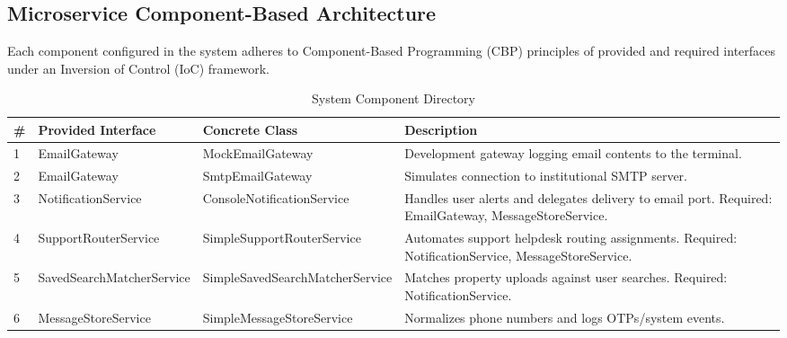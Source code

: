 \documentclass[12pt,a4paper]{article}
\begin{document}
\subsection{Microservice Component-Based Architecture}
Each component configured in the system adheres to Component-Based Programming (CBP) principles of provided and required interfaces under an Inversion of Control (IoC) framework.

\begin{table}[H]
\centering
\small
\renewcommand{\arraystretch}{1.3}
\begin{tabular}{p{} p{} p{} p{}}
\toprule
\textbf{\#} & \textbf{Provided Interface} & \textbf{Concrete Class} & \textbf{Description} \\
\midrule
1 & \hspace{0pt}Email\-Gateway & \hspace{0pt}Mock\-Email\-Gateway & Development gateway logging email contents to the terminal. \\
2 & \hspace{0pt}Email\-Gateway & \hspace{0pt}Smtp\-Email\-Gateway & Simulates connection to institutional SMTP server. \\
3 & \hspace{0pt}Notification\-Service & \hspace{0pt}Console\-Notification\-Service & Handles user alerts and delegates delivery to email port. Required: \hspace{0pt}Email\-Gateway, \hspace{0pt}Message\-Store\-Service. \\
4 & \hspace{0pt}Support\-Router\-Service & \hspace{0pt}Simple\-Support\-Router\-Service & Automates support helpdesk routing assignments. Required: \hspace{0pt}Notification\-Service, \hspace{0pt}Message\-Store\-Service. \\
5 & \hspace{0pt}Saved\-Search\-Matcher\-Service & \hspace{0pt}Simple\-Saved\-Search\-Matcher\-Service & Matches property uploads against user searches. Required: \hspace{0pt}Notification\-Service. \\
6 & \hspace{0pt}Message\-Store\-Service & \hspace{0pt}Simple\-Message\-Store\-Service & Normalizes phone numbers and logs OTPs/system events. \\
\bottomrule
\end{tabular}
\caption{System Component Directory}
\label{tab:components}
\end{table}
\end{document}
